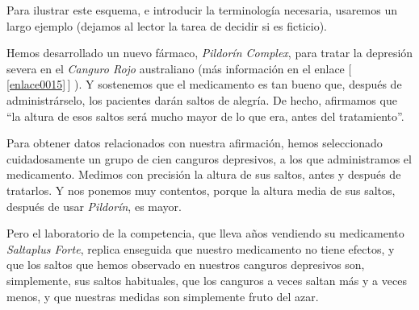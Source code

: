 Para ilustrar este esquema, e introducir la terminología necesaria, usaremos un largo ejemplo (dejamos al lector la tarea de decidir si es ficticio).

\begin{ejemplo}\label{cap07:ejem:CangurosDepresivos01}
    Hemos desarrollado un nuevo fármaco, {\em Pildorín Complex}, para tratar la depresión severa en el {\em Canguro Rojo} australiano
    (más información en el enlace [\,\ref{enlace0015}\,]\label{enlace0015a}
    ). Y sostenemos que el medicamento es tan bueno que,  después de administrárselo, los pacientes darán saltos de alegría. De hecho, afirmamos que ``la altura de esos saltos será mucho mayor de lo que era, antes del tratamiento''.

    Para obtener datos relacionados con nuestra afirmación, hemos seleccionado cuidadosamente un grupo de cien canguros depresivos, a los que administramos el medicamento. Medimos con precisión la altura de sus saltos, antes y después de tratarlos. Y nos ponemos muy contentos, porque la altura media de sus saltos, después de usar {\em Pildorín}, es mayor.

    Pero el laboratorio de la competencia, que lleva años vendiendo su medicamento {\em Saltaplus Forte}, replica enseguida que nuestro medicamento no tiene efectos, y que los saltos que hemos observado en nuestros canguros depresivos son, simplemente, sus saltos habituales, que los canguros a veces saltan más y a veces menos, y que nuestras medidas son simplemente {\sf fruto del  azar}.


\end{ejemplo}
